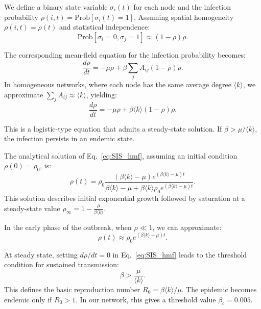 We define a binary state variable $\sigma_i(t)$ for each node and the infection probability $\rho(i,t) = \text{Prob}[\sigma_i(t) = 1]$. Assuming spatial homogeneity $\rho(i,t) = \rho(t)$ and statistical independence:
\begin{equation}
\text{Prob}[\sigma_i = 0, \sigma_j = 1] \approx (1 - \rho)\rho.
\end{equation}

The corresponding mean-field equation for the infection probability becomes:
\begin{equation}
\frac{d\rho}{dt} = -\mu \rho + \beta \sum_j A_{ij} (1 - \rho) \rho.
\end{equation}
In homogeneous networks, where each node has the same average degree $\langle k \rangle$, we approximate $\sum_j A_{ij} \approx \langle k \rangle$, yielding:
\begin{equation}
\frac{d\rho}{dt} = -\mu \rho + \beta \langle k \rangle (1 - \rho)\rho.
\label{eq:SIS_hmf}
\end{equation}

This is a logistic-type equation that admits a steady-state solution. If $\beta > \mu / \langle k \rangle$, the infection persists in an endemic state.

The analytical solution of Eq.~\eqref{eq:SIS_hmf}, assuming an initial condition $\rho(0) = \rho_0$, is:
\begin{equation}
\rho(t) = \rho_0 \frac{(\beta \langle k \rangle - \mu) e^{(\beta \langle k \rangle - \mu)t}}{\beta \langle k \rangle - \mu + \beta \langle k \rangle \rho_0 e^{(\beta \langle k \rangle - \mu)t}}.
\label{eq:SIS_analytical_full}
\end{equation}
This solution describes initial exponential growth followed by saturation at a steady-state value $\rho_\infty = 1 - \frac{\mu}{\beta \langle k \rangle}$.

In the early phase of the outbreak, when $\rho \ll 1$, we can approximate:
\begin{equation}
\rho(t) \approx \rho_0 e^{(\beta \langle k \rangle - \mu)t}.
\label{eq:SIS_exp_growth}
\end{equation}

At steady state, setting $d\rho/dt = 0$ in Eq.~\eqref{eq:SIS_hmf} leads to the threshold condition for sustained transmission:
\[
\beta > \frac{\mu}{\langle k \rangle}.
\]
This defines the basic reproduction number $R_0 = \beta \langle k \rangle / \mu$. The epidemic becomes endemic only if $R_0 > 1$. In our network, this gives a threshold value $\beta_c = 0.005$.



